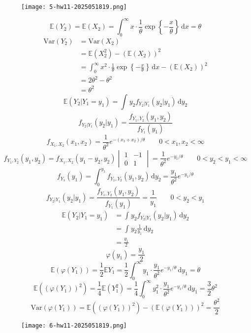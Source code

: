 \begin{exercise}
\begin{figure}[H]
\centering
\texttt{[image: 5-hw11-2025051819.png]}
\label{}
\end{figure}
\end{exercise}
\[
\mathbb{E}(Y_2)=\mathbb{E}(X_2)=\int_{0}^{\infty} x\cdot\frac{1}{\theta}\exp \left\{  -\frac{x}{\theta}  \right\} \, \mathrm{d}x =\theta
\]
\[
\begin{aligned}
\mathrm{Var}(Y_2) & =\mathrm{Var}(X_2) \\
 &  =\mathbb{E}(X_2^2)-(\mathbb{E}(X_2))^2\\
 & =\int_{0}^{\infty} x^2\cdot\frac{1}{\theta}\exp \left\{  -\frac{x}{\theta}  \right\} \, \mathrm{d}x -(\mathbb{E}(X_2))^2  \\
 & =2\theta^{2}-\theta^{2} \\
 & =\theta^{2}
\end{aligned}
\]
\[
\mathbb{E}(Y_2|Y_1=y_1)=\int_{}^{} y_2f_{Y_2|Y_1}(y_2|y_1) \, \mathrm{d}y_2 
\]
\[
f_{Y_2|Y_1}(y_2|y_1)=\frac{f_{Y_1,Y_2}(y_1,y_2)}{f_{Y_1}(y_1)}
\]
\[
f_{X_1,X_2}(x_1,x_2)=\frac{1}{\theta^{2}}e^{ -(x_1+x_2)/\theta }\qquad 0<x_1,x_2<\infty
\]
\[
f_{Y_1,Y_2}(y_1,y_2)=f_{X_1,X_2}(y_1-y_2,y_2)\begin{vmatrix}
1 & -1 \\
0 & 1 
\end{vmatrix}=\frac{1}{\theta^{2}}e^{ -y_1/\theta }\qquad 0<y_2<y_1<\infty
\]
\[
f_{Y_1}(y_1)=\int_{0}^{y_1} f_{Y_1,Y_2}(y_1,y_2) \, \mathrm{d}y_2 =\frac{y_1}{\theta^{2}}e^{ -y_1/\theta }
\]
\[
f_{Y_2|Y_1}(y_2|y_1)=\frac{f_{Y_1,Y_2}(y_1,y_2)}{f_{Y_1}(y_1)}=\frac{1}{y_1}\qquad 0<y_2<y_1
\]
\[
\begin{aligned}
\mathbb{E}(Y_2|Y_1=y_1) & =\int_{}^{} y_2f_{Y_2|Y_1}(y_2|y_1) \, \mathrm{d}y_2  \\
 & =\int_{}^{} y_2 \frac{1}{y_1} \, \mathrm{d}y_2 \\
 & =\frac{y_1}{2}
\end{aligned}
\]
\[
\varphi(y_1)=\frac{y_1}{2}
\]
\[
\mathbb{E}(\varphi(Y_1))=\frac{1}{2}\mathbb{E}Y_1=\frac{1}{2}\int_{0}^{\infty} y_1\cdot\frac{y_1}{\theta^{2}}e^{ -y_1/\theta } \, \mathrm{d}y_1=\theta
\]
\[
\mathbb{E}((\varphi(Y_1))^2)=\frac{1}{4}\mathbb{E}(Y_1^2)=\frac{1}{4}\int_{0}^{\infty} y_1^2\cdot\frac{y_1}{\theta^{2}} e^{ -y_1/\theta }\, \mathrm{d}y_1=\frac{3}{2}\theta^{2}
\]
\[
\mathrm{Var}(\varphi(Y_1))=\mathbb{E}((\varphi(Y_1))^2)-(\mathbb{E}(\varphi(Y_1)))^2=\frac{\theta^{2}}{2}
\]
\begin{exercise}
\begin{figure}[H]
\centering
\texttt{[image: 6-hw11-2025051819.png]}
\label{}
\end{figure}
\end{exercise}
